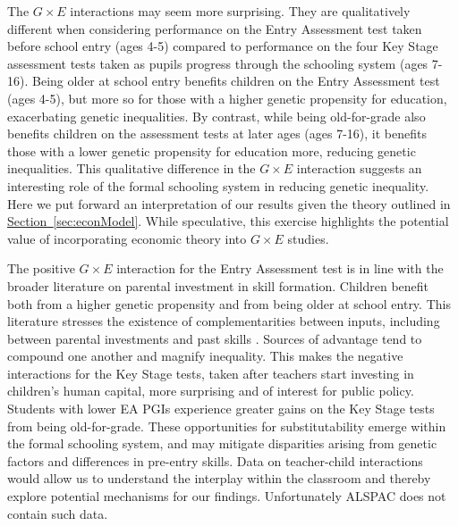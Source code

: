 \documentclass[12pt,a4paper]{article}
\begin{document}
\begin{bibunit}
The $G\times{}E$ interactions may seem more surprising. They are qualitatively different when considering performance on the Entry Assessment test taken before school entry (ages 4-5) compared to performance on the four Key Stage assessment tests taken as pupils progress through the schooling system (ages 7-16). Being older at school entry benefits children on the Entry Assessment test (ages 4-5), but more so for those with a higher genetic propensity for education, exacerbating genetic inequalities. By contrast, while being old-for-grade also benefits children on the assessment tests at later ages (ages 7-16), it benefits those with a lower genetic propensity for education more, reducing genetic inequalities. This qualitative difference in the $G\times{}E$ interaction suggests an interesting role of the formal schooling system in reducing genetic inequality.  Here we put forward an interpretation of our results given the theory outlined in \hyperref[sec:econModel]{Section~\ref*{sec:econModel}}. While speculative, this exercise highlights the potential value of incorporating economic theory into $G\times{}E$ studies.

The positive $G\times{}E$ interaction for the Entry Assessment test is in line with the broader literature on parental investment in skill formation. Children benefit both from a higher genetic propensity and from being older at school entry. This literature stresses the existence of complementarities between inputs, including between parental investments and past skills \citep[e.g.,][]{cunha2007technology,Cunha2010,Muslimova2020b}.  Sources of advantage tend to compound one another and magnify inequality. This makes the negative interactions for the Key Stage tests, taken after teachers start investing in children's human capital,  more surprising and of interest for public policy.  Students with lower EA PGIs experience greater gains on the Key Stage tests from being old-for-grade. 
These opportunities for substitutability emerge within the formal schooling system, and may mitigate disparities arising from genetic factors and differences in pre-entry skills. 
Data on teacher-child interactions would allow us to understand the interplay within the classroom and thereby explore potential mechanisms for our findings. Unfortunately ALSPAC does not contain such data.


\end{bibunit}
\end{document}
